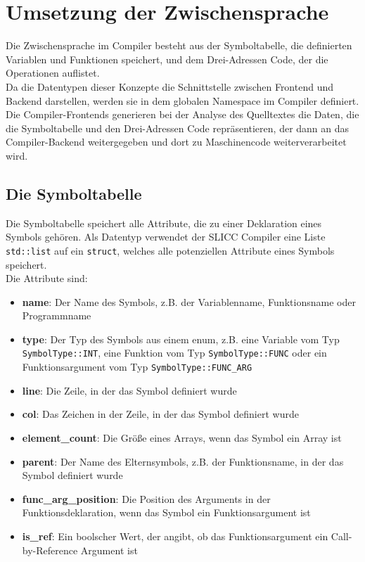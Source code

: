 \chapter{Umsetzung der Zwischensprache}
\label{chap:build:inBetweenState}

Die Zwischensprache im Compiler besteht aus der Symboltabelle, die definierten Variablen und Funktionen speichert, und dem Drei-Adressen Code, der die Operationen auflistet.\\
Da die Datentypen dieser Konzepte die Schnittstelle zwischen Frontend und Backend darstellen, werden sie in dem globalen Namespace im Compiler definiert.
Die Compiler-Frontends generieren bei der Analyse des Quelltextes die Daten, die die Symboltabelle und den Drei-Adressen Code repräsentieren, der dann an das Compiler-Backend weitergegeben und dort zu Maschinencode weiterverarbeitet wird.\\


\section{Die Symboltabelle}

Die Symboltabelle speichert alle Attribute, die zu einer Deklaration eines Symbols gehören.
Als Datentyp verwendet der \ac{SLICC} Compiler eine Liste \texttt{std::list} auf ein \texttt{struct}, welches alle potenziellen Attribute eines Symbols speichert.\\
Die Attribute sind:

\begin{itemize}
  \item \textbf{name}: Der Name des Symbols, z.B. der Variablenname, Funktionsname oder Programmname
  \item \textbf{type}: Der Typ des Symbols aus einem enum, z.B. eine Variable vom Typ \texttt{SymbolType::INT}, eine Funktion vom Typ \texttt{SymbolType::FUNC} oder ein Funktionsargument vom Typ \texttt{SymbolType::FUNC\_ARG}
  \item \textbf{line}: Die Zeile, in der das Symbol definiert wurde
  \item \textbf{col}: Das Zeichen in der Zeile, in der das Symbol definiert wurde
  \item \textbf{element\_count}: Die Größe eines Arrays, wenn das Symbol ein Array ist
  \item \textbf{parent}: Der Name des Elternsymbols, z.B. der Funktionsname, in der das Symbol definiert wurde
  \item \textbf{func\_arg\_position}: Die Position des Arguments in der Funktionsdeklaration, wenn das Symbol ein Funktionsargument ist
  \item \textbf{is\_ref}: Ein boolscher Wert, der angibt, ob das Funktionsargument ein Call-by-Reference Argument ist
\end{itemize}

